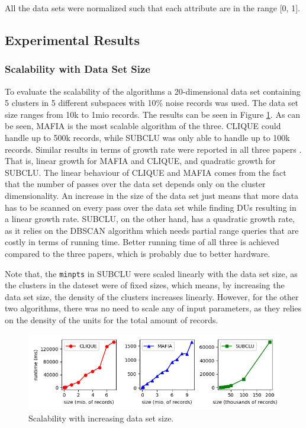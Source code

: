 All the data sets were normalized such that each attribute are in the range [0, 1].

\subsection{Experimental Results}

\subsubsection{Scalability with Data Set Size}
To evaluate the scalability of the algorithms a 20-dimensional data set containing 5 clusters in 5 different subspaces with 10\% noise records was used. The data set size ranges from 10k to 1mio records. The results can be seen in Figure \ref{fig:dataset_size_vs_runtime}. As can be seen, MAFIA is the most scalable algorithm of the three. CLIQUE could handle up to 500k records, while SUBCLU was only able to handle up to 100k records. Similar results in terms of growth rate were reported in all three papers \cite{mafia,clique,subclu}. That is, linear growth for MAFIA and CLIQUE, and quadratic growth for SUBCLU. The linear behaviour of CLIQUE and MAFIA comes from the fact that the number of passes over the data set depends only on the cluster dimensionality. An increase in the size of the data set just means that more data has to be scanned on every pass over the data set while finding DUs resulting in a linear growth rate. SUBCLU, on the other hand, has a quadratic growth rate, as it relies on the DBSCAN algorithm which needs partial range queries that are costly in terms of running time. Better running time of all three is achieved compared to the three papers, which is probably due to better hardware.

Note that, the \texttt{minpts} in SUBCLU were scaled linearly with the data set size, as the clusters in the dateset were of fixed sizes, which means, by increasing the data set size, the density of the clusters increases linearly. However, for the other two algorithms, there was no need to scale any of input parameters, as they relies on the density of the units for the total amount of records.
\begin{figure}[H]
    \vspace*{-0.5cm}
    \centering
    \includegraphics[scale=0.45]{figures/dataset_size_vs_runtime.png}
    \caption{Scalability with increasing data set size.}
    \label{fig:dataset_size_vs_runtime}
    \vspace*{-0.5cm}
\end{figure}

